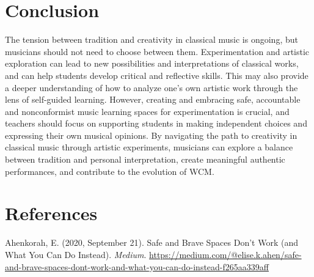 \documentclass[authordate, empirical, issue]{jote-new-article}
\begin{document}
\section{Conclusion}



The tension between tradition and creativity in classical music is ongoing, but musicians should not need to choose between them. Experimentation and artistic exploration can lead to new possibilities and interpretations of classical works, and can help students develop critical and reflective skills. This may also provide a deeper understanding of how to analyze one's own artistic work through the lens of self-guided learning. However, creating and embracing safe, accountable and nonconformist music learning spaces for experimentation is crucial, and teachers should focus on supporting students in making independent choices and expressing their own musical opinions. By navigating the path to creativity in classical music through artistic experiments, musicians can explore a balance between tradition and personal interpretation, create meaningful authentic performances, and contribute to the evolution of WCM.















































\section{References}


\hspace*{\parindent} Ahenkorah, E. (2020, September 21). Safe and Brave Spaces Don't Work (and What You Can Do Instead). \emph{Medium}. \url{https://medium.com/@elise.k.ahen/safe-and-brave-spaces-dont-work-and-what-you-can-do-instead-f265aa339aff}
\end{document}
